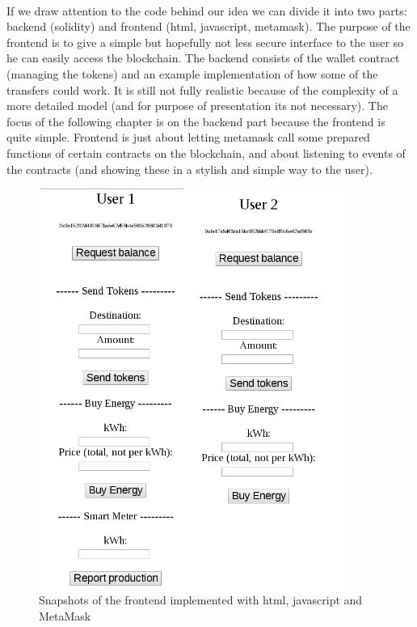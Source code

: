 \documentclass{scrartcl}
\begin{document}
   \paragraph{}
   If we draw attention to the code behind our idea we can divide it into two parts: backend (solidity) and frontend (html, javascript, metamask). The purpose of the frontend is to give a simple but hopefully not less secure interface to the user so he can easily access the blockchain. The backend consists of the wallet contract (managing the tokens) and an example implementation of how some of the transfers could work. It is still not fully realistic because of the complexity of a more detailed model (and for purpose of presentation its not necessary). The focus of the following chapter is on the backend part because the frontend is quite simple. Frontend is just about letting metamask call some prepared functions of certain contracts on the blockchain, and about listening to events of the contracts (and showing these in a stylish and simple way to the user).
   
	\begin{figure} [h!]
		\centering
		\includegraphics[width=100mm,scale=0.5]{section_4_users.PNG}
		\caption{Snapshots of the frontend implemented with html, javascript and MetaMask}
	\end{figure}
   
\end{document}
